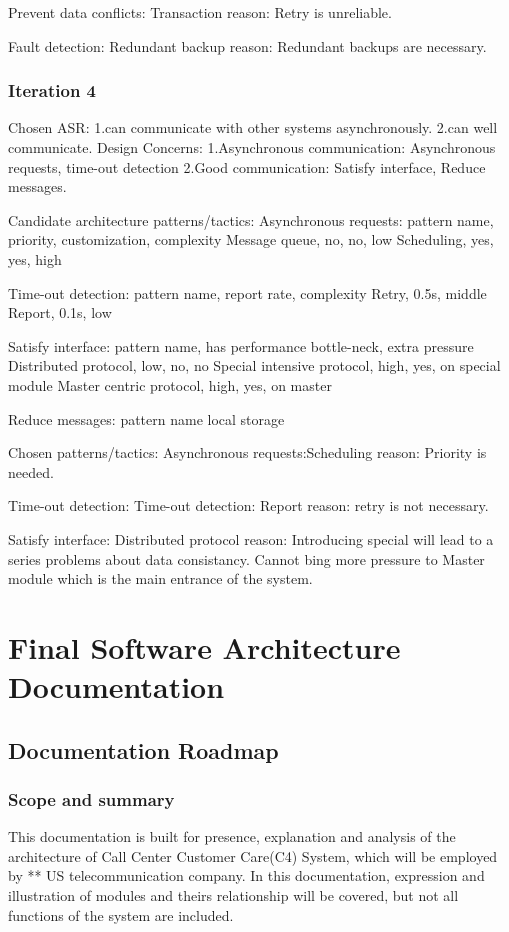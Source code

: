 \documentclass{article}
\begin{document}
		Prevent data conflicts: Transaction
		reason: Retry is unreliable.

		Fault detection: Redundant backup
		reason: Redundant backups are necessary.

		\subsubsection{Iteration 4}
		Chosen ASR: 
		1.can communicate with other systems asynchronously.
		2.can well communicate.
		Design Concerns:
		1.Asynchronous communication: Asynchronous requests, time-out detection
		2.Good communication: Satisfy interface, Reduce messages.

		Candidate architecture patterns/tactics:
		Asynchronous requests:
			pattern name, priority, customization, complexity
			Message queue, no, no, low
			Scheduling, yes, yes, high
		
		Time-out detection:
			pattern name, report rate, complexity
			Retry, 0.5s, middle
			Report, 0.1s, low
		
		Satisfy interface:
			pattern name, has performance bottle-neck, extra pressure
			Distributed protocol, low, no, no
			Special intensive protocol, high, yes, on special module
			Master centric protocol, high, yes, on master
		
		Reduce messages:
			pattern name
			local storage
		
		Chosen patterns/tactics:
		Asynchronous requests:Scheduling
		reason: Priority is needed.

		Time-out detection:
		Time-out detection: Report
		reason: retry is not necessary.

		Satisfy interface: Distributed protocol
		reason: Introducing special will lead to a series problems about data consistancy. Cannot bing more pressure to Master module which is the main entrance of the system.


		
		

	\section{Final Software Architecture Documentation}
	\subsection{Documentation Roadmap}
	\subsubsection{Scope and summary}
	This documentation is built for presence, explanation and analysis of the architecture of Call Center Customer Care(C4) System, which will be employed by ** US telecommunication company. In this documentation, expression and illustration of modules and theirs relationship will be covered, but not all functions of the system are included.
\end{document}

